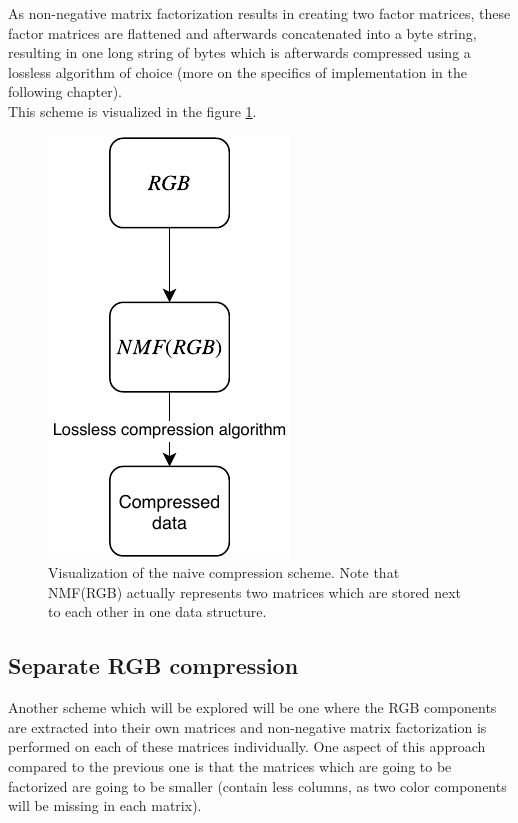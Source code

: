 \documentclass[thesis=M,english]{FITthesis}[2012/10/20]
\begin{document}
As non-negative matrix factorization results in creating two factor
matrices, these factor matrices are flattened and afterwards concatenated into
a byte string, resulting in one long string of bytes which is afterwards
compressed using a lossless algorithm of choice (more on the specifics of
implementation in the following chapter). 
\\

This scheme is visualized in the figure \ref{fig:nmf-naive-scheme}.

\begin{figure}[h]
  \centering
  \includegraphics{nmf-naive-scheme}
  \caption{Visualization of the naive compression scheme. Note that NMF(RGB) actually
  represents two matrices which are stored next to each other in one data structure.}
  \label{fig:nmf-naive-scheme}
\end{figure}

\subsection{Separate RGB compression}
Another scheme which will be explored will be one where the RGB components
are extracted into their own matrices and non-negative matrix factorization
is performed on each of these matrices individually. One aspect of this approach
compared to the previous one is that the matrices which are going to be factorized
are going to be smaller (contain less columns, as two color components will be missing
in each matrix).
\\
\end{document}
